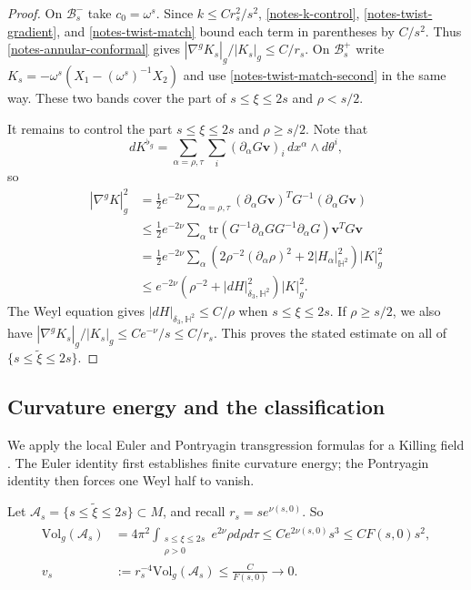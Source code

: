 \documentclass[letterpaper]{amsart}
\theoremstyle{definition}
\theoremstyle{remark}
\def\Vol{\mathrm{Vol}}
\begin{document}
\begin{proof}
On $\mathcal B_s^-$ take $c_0=\omega^s$.
Since $k\le Cr_s^2/s^2$, \eqref{notes-k-control},
\eqref{notes-twist-gradient}, and \eqref{notes-twist-match} bound each
term in parentheses by $C/s^2$. Thus \eqref{notes-annular-conformal}
gives $|\nabla^gK_s|_g/|K_s|_g\le C/r_s$.
On $\mathcal B_s^+$ write
$K_s=-\omega^s(X_1-(\omega^s)^{-1}X_2)$ and use
\eqref{notes-twist-match-second} in the same way.
These two bands cover the part of $s\le\xi\le2s$ and $\rho<s/2$. 


It remains to control the part $s\le\xi\le2s$ and $\rho\ge s/2$. Note that 
$$dK^{\flat_g}
=\sum_{\alpha=\rho,\tau}\sum_i(\partial _\alpha G\mathbf v)_i\,dx^\alpha\wedge d\theta^i,$$
so
\begin{align*}
	|\nabla ^{g}K|^2_g &= \frac12e^{-2\nu}
\sum_{\alpha=\rho,\tau}
(\partial _\alpha G\mathbf v)^TG^{-1}(\partial _\alpha G\mathbf v) \\
			   & \leq \frac{1}{2} e ^{-2 \nu } \sum_{\alpha }^{} \mathrm{tr}(G ^{-1}\partial _\alpha G G ^{-1} \partial _\alpha G) \mathbf{v}^{T}G \mathbf{v}\\
			   &= \frac{1}{2} e ^{-2 \nu } \sum_{\alpha }^{} \left( 2\rho ^{-2} (\partial _\alpha \rho )^2 + 2|H_{\alpha }|^2_{\mathbb{H}^2} \right)|K|^2_g\\
			   &\leq e ^{-2 \nu }(\rho ^{-2} + |d H|^2_{\delta _3, \mathbb{H}^2})|K|^2_g.
\end{align*} 
The Weyl equation gives
$|dH|_{\delta_3,\mathbb H^2}\le C/\rho $ when $s \leq \xi \leq 2s$. If $\rho \geq s/ 2$, we also have $|\nabla ^{g}K_s|_g /|K_s|_g \leq C e ^{-\nu } /s \leq C / r_s$.
This proves the stated estimate on all of $\{s\le\tilde\xi\le2s\}$.
\end{proof}

\subsection{Curvature energy and the classification}
We apply the local Euler and Pontryagin transgression formulas for a
Killing field \cite[Sections~2.1--2.2]{notes-Weber}. The Euler identity first
establishes finite curvature energy; the Pontryagin identity then forces
one Weyl half to vanish.

Let $\mathcal A_s=\{s\le\tilde\xi\le2s\}\subset M$, and recall $r_s=se^{\nu(s,0)}$.
So
\begin{align}\label{notes-annular-collapse}
	\begin{split}
		\Vol_g(\mathcal A_s) &= 4 \pi ^2 \int_{\substack{s\le\xi\le2s\\\rho>0}} e^{2 \nu } \rho d \rho d \tau \leq C e ^{2\nu (s,0)} s ^3 \le C F(s, 0) s^2,\\
		v_s&:=r_s^{-4}\Vol_g(\mathcal A_s)
       \le\frac{C}{F(s,0)}\to 0.
	\end{split} 
\end{align}
\end{document}
